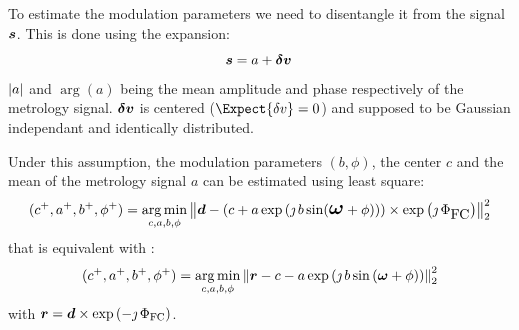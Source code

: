 \documentclass[a4paper,11pt,twoside]{scrartcl}
\begin{document}
To estimate the modulation parameters we need to disentangle it from the signal  $\boldsymbol{s}$. This is done using the expansion:
\begin{equation}
    \boldsymbol{s} = a  + \boldsymbol{\delta v}\,
\end{equation}
$\vert a\vert$  and $\arg{(a)}$ being the  mean amplitude and phase respectively of the metrology signal.  $ \boldsymbol{\delta v}$ is centered ($\Expect{\delta v}= 0$)  and supposed to be Gaussian independant and identically distributed.


Under this assumption, the modulation parameters $( b, \phi)$, the center $c$ and the mean of the metrology signal $a$ can be estimated using least square:
\begin{equation}
    (c^+, a^+, b^+, \phi^+) = \argmin_{c,a,b,\phi} \Norm{\V{d} -  \left(c + a \exp\left( \jmath \, b \sin\Large( \V{\omega} + \phi\right)\Large)\right)\times\exp\left(\jmath\,\Phi_\textrm{FC}\right) }_2^2
\end{equation}
that is equivalent with : 
\begin{equation}
    (c^+, a^+, b^+, \phi^+) = \argmin_{c,a,b,\phi} \Norm{\V{r} -  c - a \exp\left( \jmath \, b \sin\left( \V{\omega} + \phi\right)\right) }_2^2\label{eq:r}
\end{equation}
with $\boldsymbol{r} =\boldsymbol{d}\times\exp\left(-\jmath\,\Phi_\textrm{FC}\right)$.
\end{document}
